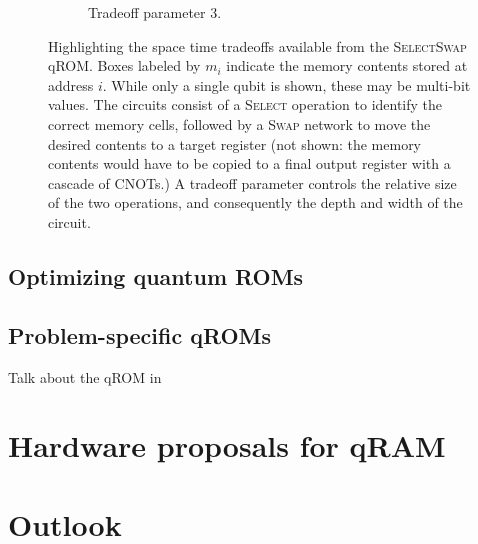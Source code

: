 \documentclass[a4paper,12pt]{article}
\begin{document}
\begin{figure}
\begin{subfigure}[ht!]{\textwidth}
 \caption{Tradeoff parameter 3.}
 \end{subfigure}
 \caption{Highlighting the space time tradeoffs available from the \textsc{SelectSwap} qROM. Boxes labeled by $m_i$ indicate the memory contents stored at address $i$. While only a single qubit is shown, these may be multi-bit values. The circuits consist of a \textsc{Select}  operation to identify the correct memory cells, followed by a \textsc{Swap}  network to move the desired contents to a target register (not shown: the memory contents would have to be copied to a final output register with a cascade of CNOTs.) A tradeoff parameter controls the relative size of the two operations, and consequently the depth and width of the circuit.}
\end{figure} 
 
\subsection{Optimizing quantum ROMs}

\subsection{Problem-specific qROMs}

Talk about the qROM in \cite{Babbush2018}

\section{Hardware proposals for qRAM}
\label{sec:hardware}




\section{Outlook}
\label{sec:outlook}
\end{document}
